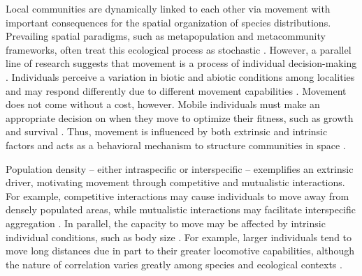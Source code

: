 \documentclass[11pt, class=article, crop=false]{standalone}
\begin{document}
Local communities are dynamically linked to each other via movement with important consequences for the spatial organization of species distributions. Prevailing spatial paradigms, such as metapopulation and metacommunity frameworks, often treat this ecological process as stochastic \citep{thompsonProcessbasedMetacommunityFramework2020}. However, a parallel line of research suggests that movement is a process of individual decision-making \citep{clobertDispersalEcologyEvolution2012}. Individuals perceive a variation in biotic and abiotic conditions among localities and may respond differently due to different movement capabilities \citep{clobertDispersalEcologyEvolution2012}. Movement does not come without a cost, however. Mobile individuals must make an appropriate decision on when they move to optimize their fitness, such as growth and survival \citep{bonteCostsDispersal2012}. Thus, movement is influenced by both extrinsic and intrinsic factors and acts as a behavioral mechanism to structure communities in space \citep{leiboldMetacommunityConceptFramework2004, mcpeekEvolutionPassiveDispersal2024, schlagelMovementmediatedCommunityAssembly2020}. 

Population density – either intraspecific or interspecific – exemplifies an extrinsic driver, motivating movement through competitive and mutualistic interactions. For example, competitive interactions may cause individuals to move away from densely populated areas, while mutualistic interactions may facilitate interspecific aggregation \citep{thierryInterplayAbioticBiotic2024, rasmussenIndividualMovementStream2017}. In parallel, the capacity to move may be affected by intrinsic individual conditions, such as body size \citep{clobertDispersalEcologyEvolution2012}. For example,  larger individuals tend to move long distances due in part to their greater locomotive capabilities, although the nature of correlation varies greatly among species and ecological contexts \citep{comteEvidenceDispersalSyndromes, teruiParasiteInfectionInduces2017, radingerPatternsPredictorsFish2014, debeffeConditiondependentNatalDispersal2012,gilliamMovementCorridorsEnhancement2001}.
\end{document}
